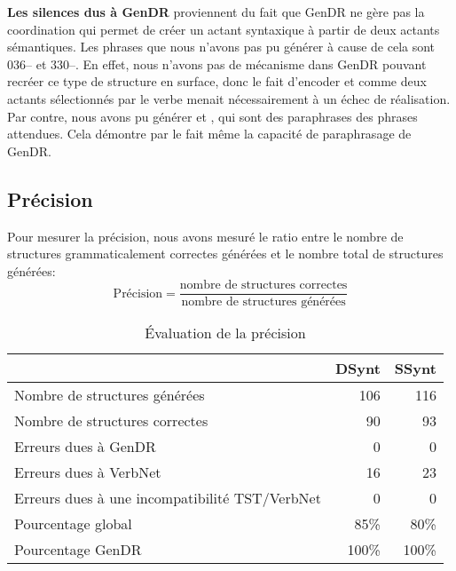 \textbf{Les silences dus à GenDR} proviennent du fait que GenDR ne gère pas la coordination qui permet de créer un actant syntaxique à partir de deux actants sémantiques. Les phrases que nous n'avons pas pu générer à cause de cela sont 036-- et 330--. En effet, nous n'avons pas de mécanisme dans GenDR pouvant recréer ce type de structure en surface, donc le fait d'encoder  et  comme deux actants sélectionnés par le verbe menait nécessairement à un échec de réalisation. Par contre, nous avons pu générer  et , qui sont des paraphrases des phrases attendues. Cela démontre par le fait même la capacité de paraphrasage de GenDR.


\subsection{Précision}\label{sec:precision}
Pour mesurer la précision, nous avons mesuré le ratio entre le nombre de structures grammaticalement correctes générées et le nombre total de structures générées:
\[\text{Précision} = \frac{\text{nombre de structures correctes}}{\text{nombre de structures générées}}\]

\begin{table}
\caption{Évaluation de la précision}
\label{fig:evaluationprecision}
\begin{tabular}{lrr}
 \toprule
  & DSynt & SSynt\\
 \midrule
 Nombre de structures générées   & 106  & 116 \\
 Nombre de structures correctes  &  90  & 93   \\
 Erreurs dues à GenDR & 0 & 0\\
 Erreurs dues à VerbNet    & 16 & 23\\
 Erreurs dues à une incompatibilité TST/VerbNet & 0 & 0\\
 \midrule
 Pourcentage global & 85\%  & 80\% \\
 Pourcentage GenDR & 100\%  & 100\% \\
 \bottomrule
\end{tabular}
\end{table}


